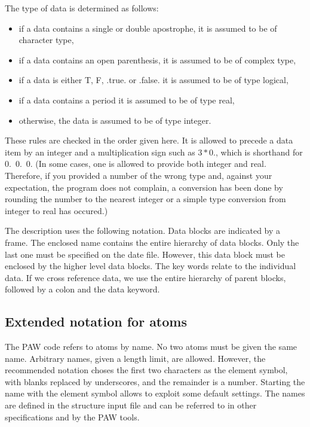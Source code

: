 \documentclass[final,12pt]{article}
\begin{document}
The type of data is determined as follows:
\begin{itemize}
\item if a data contains a single or double apostrophe, it is
  assumed to be of character type,
\item if a data contains an open parenthesis, it is assumed to be of
  complex type,
\item if a data is either T, F, .true. or .false. it is assumed to be of
  type logical,
\item if a data contains a period it is assumed to be of type real,
\item otherwise, the data is assumed to be of type integer.
\end{itemize}
These rules are checked in the order given here.  It is allowed to
precede a data item by an integer and a multiplication sign such as
$3*0.$, which is shorthand for 0.\ 0.\ 0. (In some cases, one is
allowed to provide both integer and real. Therefore, if you provided a
number of the wrong type and, against your expectation, the program
does not complain, a conversion has been done by rounding the number
to the nearest integer or a simple type conversion from integer to
real has occured.)

The description uses the following notation. Data blocks are
indicated by a frame. The enclosed name contains the entire
hierarchy of data blocks. Only the last one must be specified on the
date file. However, this data block must be enclosed by the higher
level data blocks. The key words relate to the individual data. If we
cross reference data, we use the entire hierarchy of parent
blocks, followed by a colon and the data keyword.

%
\subsection{Extended notation for atoms}

The PAW code refers to atoms by name. No two atoms must be given the
same name. Arbitrary names, given a length limit, are allowed.
However, the recommended notation choses the first two characters as
the element symbol, with blanks replaced by underscores, and the
remainder is a number. Starting the name with the element symbol
allows to exploit some default settings. The names are defined in the
structure input file and can be referred to in other specifications
and by the PAW tools.
\end{document}
